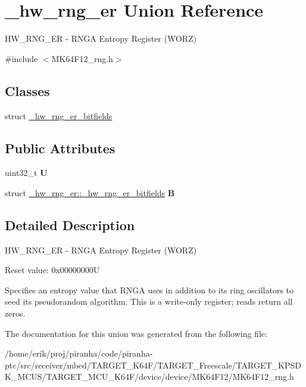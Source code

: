 \hypertarget{union__hw__rng__er}{}\section{\+\_\+hw\+\_\+rng\+\_\+er Union Reference}
\label{union__hw__rng__er}


H\+W\+\_\+\+R\+N\+G\+\_\+\+ER -\/ R\+N\+GA Entropy Register (W\+O\+RZ)  




{\ttfamily \#include $<$M\+K64\+F12\+\_\+rng.\+h$>$}

\subsection*{Classes}
\begin{DoxyCompactItemize}
\item 
struct \hyperlink{struct__hw__rng__er_1_1__hw__rng__er__bitfields}{\+\_\+hw\+\_\+rng\+\_\+er\+\_\+bitfields}
\end{DoxyCompactItemize}
\subsection*{Public Attributes}
\begin{DoxyCompactItemize}
\item 
uint32\+\_\+t {\bfseries U}\hypertarget{union__hw__rng__er_aef3c93fd91b6f2d2f3d50e7a7b954e22}{}\label{union__hw__rng__er_aef3c93fd91b6f2d2f3d50e7a7b954e22}

\item 
struct \hyperlink{struct__hw__rng__er_1_1__hw__rng__er__bitfields}{\+\_\+hw\+\_\+rng\+\_\+er\+::\+\_\+hw\+\_\+rng\+\_\+er\+\_\+bitfields} {\bfseries B}\hypertarget{union__hw__rng__er_a96386f013a1a98d8648c84e60de27fcf}{}\label{union__hw__rng__er_a96386f013a1a98d8648c84e60de27fcf}

\end{DoxyCompactItemize}


\subsection{Detailed Description}
H\+W\+\_\+\+R\+N\+G\+\_\+\+ER -\/ R\+N\+GA Entropy Register (W\+O\+RZ) 

Reset value\+: 0x00000000U

Specifies an entropy value that R\+N\+GA uses in addition to its ring oscillators to seed its pseudorandom algorithm. This is a write-\/only register; reads return all zeros. 

The documentation for this union was generated from the following file\+:\begin{DoxyCompactItemize}
\item 
/home/erik/proj/piranha/code/piranha-\/ptc/src/receiver/mbed/\+T\+A\+R\+G\+E\+T\+\_\+\+K64\+F/\+T\+A\+R\+G\+E\+T\+\_\+\+Freescale/\+T\+A\+R\+G\+E\+T\+\_\+\+K\+P\+S\+D\+K\+\_\+\+M\+C\+U\+S/\+T\+A\+R\+G\+E\+T\+\_\+\+M\+C\+U\+\_\+\+K64\+F/device/device/\+M\+K64\+F12/M\+K64\+F12\+\_\+rng.\+h\end{DoxyCompactItemize}
